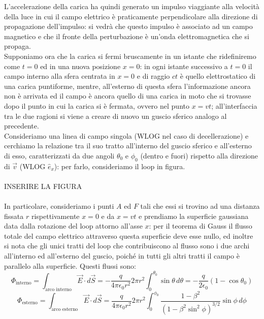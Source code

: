 \documentclass[]{article}
\begin{document}
L'accelerazione della carica ha quindi generato un impulso viaggiante alla velocità della luce in cui il campo elettrico è praticamente perpendicolare alla direzione di propagazione dell'impulso: si vedrà che questo impulso è associato ad un campo magnetico e che il fronte della perturbazione è un'onda elettromagnetica che si propaga. \\ 
Supponiamo ora che la carica si fermi bruscamente in un istante che ridefiniremo come $ t = 0 $ ed in una nuova posizione $ x = 0 $: in ogni istante successivo a $ t = 0 $ il campo interno alla sfera centrata in $ x = 0 $ e di raggio $ ct $ è quello elettrostatico di una carica puntiforme, mentre, all'esterno di questa sfera l'informazione ancora non è arrivata ed il campo è ancora quello di una carica in moto che si trovasse dopo il punto in cui la carica si è fermata, ovvero nel punto $ x = vt $; all'interfaccia tra le due ragioni si viene a creare di nuovo un guscio sferico analogo al precedente. \\ 
%
Consideriamo una linea di campo singola (WLOG nel caso di decellerazione) e cerchiamo la relazione tra il suo tratto all'interno del guscio sferico e all'esterno di esso, caratterizzati da due angoli $ \theta_0 $ e $ \phi_0 $ (dentro e fuori) rispetto alla direzione di $ \vec{v} $ (WLOG $ \hat{e}_x $): per farlo, consideriamo il loop in figura. \\ 
%
%
%
\hbox{} \\ INSERIRE LA FIGURA \\ \hbox{} \\ 
%
%
%
In particolare, consideriamo i punti $ A $ ed $ F $ tali che essi si trovino ad una distanza fissata $ r $ rispettivamente $ x = 0 $ e da $ x = vt $ e prendiamo la superficie gaussiana data dalla rotazione del loop attorno all'asse $ x $: per il teorema di Gauss il flusso totale del campo elettrico attraverso questa superficie deve esse nullo, ed inoltre si nota che gli unici tratti del loop che contribuiscono al flusso sono i due archi all'interno ed all'esterno del guscio, poiché in tutti gli altri tratti il campo è parallelo alla superficie. Questi flussi sono:
\begin{equation}
	\Phi_{\text{interno}} = \int_{\text{arco interno}} \vec{E}\cdot d\vec{S} = -\frac{q}{4\pi\epsilon_0 r^2} 2\pi r^2 \int_0^{\theta_0} \sin\theta \,d\theta = -\frac{q}{2\epsilon_0} (1-\cos\theta_0)
	\label{eq:33}
\end{equation}
\begin{equation}
	\Phi_{\text{esterno}} = \int_{\text{arco esterno}} \vec{E}\cdot d\vec{S} = \frac{q}{4\pi\epsilon_0 r^2} 2\pi r^2 \int_0^{\phi_0} \displaystyle\frac{1 - \beta^2}{(1 - \beta^2 \sin^2\phi)^{3/2}} \sin\phi \,d\phi
	\label{eq:34}
\end{equation}
\end{document}

